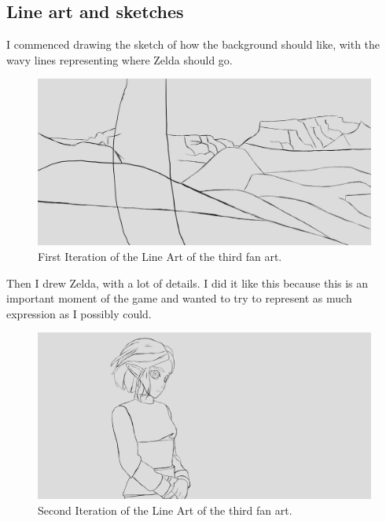 \documentclass{cup-pan}
\begin{document}
    \subsection{Line art and sketches}
        I commenced drawing the sketch of how the background should like, with the wavy lines representing where Zelda should go. 
        \begin{figure}[H]
            \includegraphics[width=\textwidth]{Fanart3/1_LineArt/I_Iteracion.png}
            \caption{First Iteration of the Line Art of the third fan art.}
        \end{figure}

        Then I drew Zelda, with a lot of details. I did it like this because this is an important moment of the game and wanted to try to represent as much expression as I possibly could. 
        \begin{figure}[H]
            \includegraphics[width=\textwidth]{Fanart3/1_LineArt/II_Iteracion.png}
            \caption{Second Iteration of the Line Art of the third fan art.}
        \end{figure}
\end{document}
